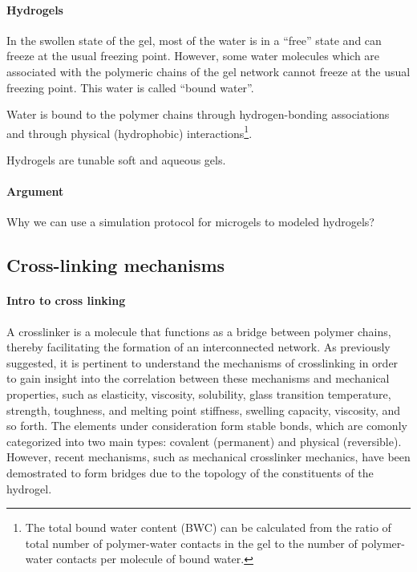 \paragraph{Hydrogels}
In the swollen state of the gel, most of the water is in a “free” state and can freeze at the usual freezing point. 
However, some water molecules which are associated with the polymeric chains of the gel network cannot freeze at the usual freezing point. 
This water is called “bound water”\citep{lelePredictionsBoundWater1997}.

Water is bound to the polymer chains through hydrogen-bonding associations and through physical (hydrophobic) interactions\footnote{The total bound water content (BWC) can be calculated from the ratio of total number of polymer-water contacts in the gel to the number of polymer-water contacts per molecule of bound water.}\citep{lelePredictionsBoundWater1997}. 

Hydrogels are tunable soft and aqueous gels\citep{bonyadiReviewFrictionLubrication2020}.


\paragraph{Argument} Why we can use a simulation protocol for microgels to modeled hydrogels?




\subsection{Cross-linking mechanisms}

\paragraph{Intro to cross linking}
A crosslinker is a molecule that functions as a bridge between polymer chains, thereby facilitating the formation of an interconnected network.
As previously suggested, it is pertinent to understand the mechanisms of crosslinking in order to gain insight into the correlation between these mechanisms and mechanical properties, such as elasticity, viscosity, solubility, glass transition temperature, strength, toughness, and melting point stiffness, swelling capacity, viscosity, and so forth\citep{priyaComprehensiveReviewHydrogel2024}.
The elements under consideration form stable bonds, which are comonly categorized into two main types: covalent (permanent) and physical (reversible)\citep{bustamantetorresHydrogelsClassificationAccording2021}.
However, recent mechanisms, such as mechanical crosslinker mechanics, have been demostrated to form bridges due to the topology of the constituents of the hydrogel.

